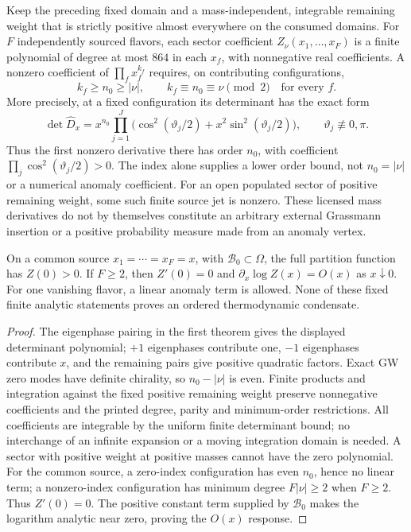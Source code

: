 \documentclass[12pt,a4paper]{article}
\begin{document}
\begin{theorem}
\label{p10:thm:v2189-topological-source-jet-hierarchy}
Keep the preceding fixed domain and a mass-independent, integrable remaining
weight that is strictly positive almost everywhere on the consumed domains. For $F$ independently sourced flavors, each sector coefficient
$Z_\nu(x_1,\ldots,x_F)$ is a finite polynomial of degree at most $864$
in each $x_f$, with nonnegative real coefficients. A nonzero coefficient
of $\prod_fx_f^{k_f}$ requires, on contributing configurations,
\[
 k_f\ge n_0\ge|\nu|,
 \qquad k_f\equiv n_0\equiv\nu\pmod2
 \quad\text{for every }f.
\]
More precisely, at a fixed configuration its determinant has the exact form
\[
 \det\widehat D_x
 =x^{n_0}\prod_{j=1}^{J}
       \bigl(\cos^2(\vartheta_j/2)+x^2\sin^2(\vartheta_j/2)\bigr),
 \qquad \vartheta_j\not\equiv0,\pi.
\]
Thus the first nonzero derivative there has order $n_0$, with coefficient
$\prod_j\cos^2(\vartheta_j/2)>0$. The index alone supplies a lower
order bound, not $n_0=|\nu|$ or a numerical anomaly coefficient.
For an open populated sector of positive remaining weight, some such
finite source jet is nonzero. These licensed mass derivatives do not by
themselves constitute an arbitrary external Grassmann insertion or a
positive probability measure made from an anomaly vertex.

On a common source $x_1=\cdots=x_F=x$, with $\mathcal B_0\subset\Omega$,
the full partition function has $Z(0)>0$. If $F\ge2$, then
$Z'(0)=0$ and $\partial_x\log Z(x)=O(x)$ as $x\downarrow0$.
For one vanishing flavor, a linear anomaly term is allowed.
None of these fixed finite analytic statements proves an ordered
thermodynamic condensate.
\end{theorem}
\begin{proof}
The eigenphase pairing in the first theorem gives the displayed determinant
polynomial; $+1$ eigenphases contribute one, $-1$ eigenphases contribute
$x$, and the remaining pairs give positive quadratic factors. Exact GW
zero modes have definite chirality, so $n_0-|\nu|$ is even.
Finite products and integration against the fixed positive remaining
weight preserve nonnegative coefficients and the printed degree, parity
and minimum-order restrictions. All coefficients are integrable by the
uniform finite determinant bound; no interchange of an infinite expansion
or a moving integration domain is needed. A sector with positive weight
at positive masses cannot have the zero polynomial.
For the common source, a zero-index configuration has even $n_0$, hence
no linear term; a nonzero-index configuration has minimum degree
$F|\nu|\ge2$ when $F\ge2$. Thus $Z'(0)=0$.
The positive constant term supplied by $\mathcal B_0$ makes the logarithm
analytic near zero, proving the $O(x)$ response.
\end{proof}
\end{document}
